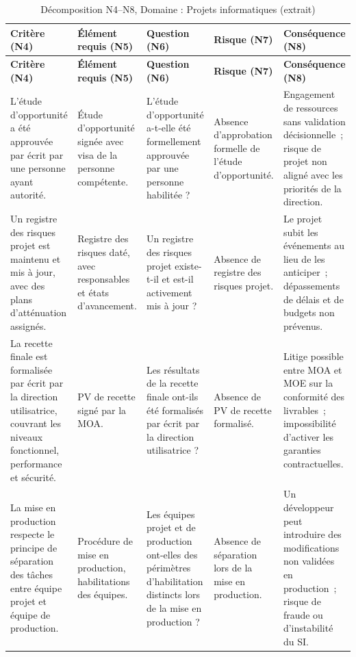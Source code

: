 \begin{longtable}{p{3.2cm}p{3cm}p{2.8cm}p{2.6cm}p{2.8cm}}
\caption{Décomposition N4--N8, Domaine : Projets informatiques (extrait)} \\
\toprule
\textbf{Critère (N4)} & \textbf{Élément requis (N5)} & \textbf{Question (N6)} & \textbf{Risque (N7)} & \textbf{Conséquence (N8)} \\
\midrule
\endfirsthead
\toprule
\textbf{Critère (N4)} & \textbf{Élément requis (N5)} & \textbf{Question (N6)} & \textbf{Risque (N7)} & \textbf{Conséquence (N8)} \\
\midrule
\endhead
\bottomrule
\endlastfoot

L'étude d'opportunité a été approuvée par écrit par une personne ayant autorité. &
Étude d'opportunité signée avec visa de la personne compétente. &
L'étude d'opportunité a-t-elle été formellement approuvée par une personne habilitée ? &
Absence d'approbation formelle de l'étude d'opportunité. &
Engagement de ressources sans validation décisionnelle~; risque de projet non aligné avec les priorités de la direction. \\
\addlinespace

Un registre des risques projet est maintenu et mis à jour, avec des plans d'atténuation assignés. &
Registre des risques daté, avec responsables et états d'avancement. &
Un registre des risques projet existe-t-il et est-il activement mis à jour ? &
Absence de registre des risques projet. &
Le projet subit les événements au lieu de les anticiper~; dépassements de délais et de budgets non prévenus. \\
\addlinespace

La recette finale est formalisée par écrit par la direction utilisatrice, couvrant les niveaux fonctionnel, performance et sécurité. &
PV de recette signé par la MOA. &
Les résultats de la recette finale ont-ils été formalisés par écrit par la direction utilisatrice ? &
Absence de PV de recette formalisé. &
Litige possible entre MOA et MOE sur la conformité des livrables~; impossibilité d'activer les garanties contractuelles. \\
\addlinespace

La mise en production respecte le principe de séparation des tâches entre équipe projet et équipe de production. &
Procédure de mise en production, habilitations des équipes. &
Les équipes projet et de production ont-elles des périmètres d'habilitation distincts lors de la mise en production ? &
Absence de séparation lors de la mise en production. &
Un développeur peut introduire des modifications non validées en production~; risque de fraude ou d'instabilité du SI. \\

\end{longtable}


